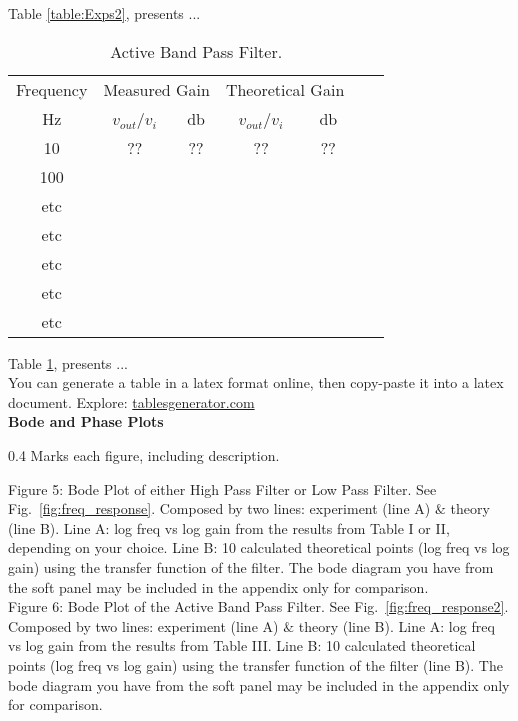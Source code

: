 \documentclass[journal]{IEEEtran}
\begin{document}
Table \ref{table:Exps2}, presents ...\\[0.1in]

\begin{table}[!ht] %
\centering
\caption{Active Band Pass Filter.}
\begin{tabular}{ccccccc}
Frequency & \multicolumn{2}{l}{Measured Gain} & \multicolumn{2}{l}{Theoretical Gain} \\
Hz   & $v_{out}$/$v_i$  & db  & $v_{out}$/$v_i$   & db  \\ \hline
10  & ??   & ?? & ??   & ??       \\
100 &  &   &   &   \\
etc &  &   &   &      \\                       
etc &  &   &   &      \\                       
etc &  &   &   &      \\  
etc &  &   &   &      \\  
etc &  &   &   &      

\end{tabular}
\label{table:Exps3}
\end{table}

Table \ref{table:Exps3}, presents ...\\[0.05in]


You can generate a table in a latex format online, then copy-paste it into a latex document. Explore: 
 \href{https://www.tablesgenerator.com}{tablesgenerator.com} \\[0.075in]
 
{\bf Bode and Phase Plots}  
\begin{flushright} 0.4 Marks each figure, including description. \end{flushright}
Figure 5: Bode Plot of either High Pass Filter or Low Pass Filter. See Fig.~\ref{fig:freq_response}. Composed by two lines: experiment (line A) $\&$ theory (line B). Line A: log freq vs log gain from the results from Table I or II, depending on your choice. Line B: 10 calculated theoretical points (log freq vs log gain) using the transfer function of the filter. The bode diagram you have from the soft panel may be included in the appendix only for comparison.\\  

Figure 6: Bode Plot of the Active Band Pass Filter. See Fig.~\ref{fig:freq_response2}. Composed by two lines: experiment (line A) $\&$ theory (line B). Line A: log freq vs log gain from the results from Table III. Line B: 10 calculated theoretical points (log freq vs log gain) using the transfer function of the filter (line B). The bode diagram you have from the soft panel may be included in the appendix only for comparison.\\  
\end{document}
